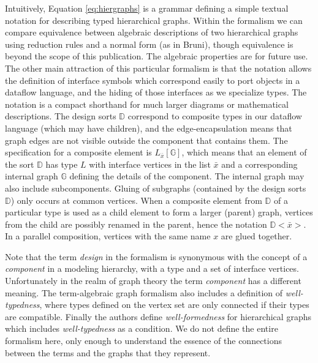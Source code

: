 Intuitively, Equation \ref{eq:hiergraphs} is a grammar defining a simple textual notation for describing typed hierarchical graphs.  Within the formalism we can compare equivalence between algebraic descriptions of two hierarchical graphs using reduction rules and a normal form (as in Bruni\cite{graphs:hier_algebra}), though equivalence is beyond the scope of this publication. The algebraic properties are for future use. The other main attraction of this particular formalism is that the notation allows the definition of interface symbols which correspond easily to port objects in a dataflow language, and the hiding of those interfaces as we specialize types.  The notation is a compact shorthand for much larger diagrams or mathematical descriptions. The design sorts $\mathbb{D}$ correspond to composite types in our dataflow language (which may have children), and the edge-encapsulation means that graph edges are not visible outside the component that contains them.   The specification for a composite element is $L_{\bar{x}} [\mathbb{G} ]$, which means that an element of the sort $\mathbb{D}$ has type $L$ with interface vertices in the list $\bar{x}$ and a corresponding internal graph $\mathbb{G}$ defining the details of the component. The internal graph may also include subcomponents. Gluing of subgraphs (contained by the design sorts $\mathbb{D}$) only occurs at common vertices.  When a composite element from $\mathbb{D}$ of a particular type is used as a child element to form a  larger (parent) graph, vertices from the child are possibly renamed in the parent, hence the notation $\mathbb{D} <\bar{x}> $.  In a parallel composition, vertices with the same name $x$ are glued together.

Note that the term \emph{design} in the formalism is synonymous with the concept of a \emph{component} in a modeling hierarchy, with a type and a set of interface vertices. Unfortunately in the realm of graph theory the term \emph{component} has a different meaning.  The term-algebraic graph formalism also includes a definition of \emph{well-typedness}, where types defined on the vertex set are only connected if their types are compatible.  Finally the authors define \emph{well-formedness} for hierarchical graphs which includes \emph{well-typedness} as a condition.  We do not define the entire formalism here, only enough to understand the essence of the 
connections between the terms and the graphs that they represent.

